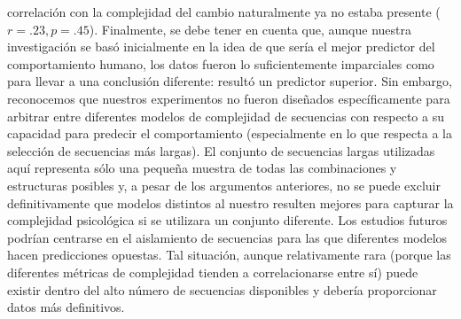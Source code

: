 correlación con la complejidad del cambio naturalmente ya no estaba presente ($r = .23, p = .45$). Finalmente, se debe tener en cuenta que, aunque nuestra investigación se basó inicialmente en la idea de que \mdlbin sería el mejor predictor del comportamiento humano, los datos fueron lo suficientemente imparciales como para llevar a una conclusión diferente: \mdlbinfrag resultó un predictor superior. Sin embargo, reconocemos que nuestros experimentos no fueron diseñados específicamente para arbitrar entre diferentes modelos de complejidad de secuencias con respecto a su capacidad para predecir el comportamiento (especialmente en lo que respecta a la selección de secuencias más largas). El conjunto de secuencias largas utilizadas aquí representa sólo una pequeña muestra de todas las combinaciones y estructuras posibles y, a pesar de los argumentos anteriores, no se puede excluir definitivamente que modelos distintos al nuestro resulten mejores para capturar la complejidad psicológica si se utilizara un conjunto diferente. Los estudios futuros podrían centrarse en el aislamiento de secuencias para las que diferentes modelos hacen predicciones opuestas. Tal situación, aunque relativamente rara (porque las diferentes métricas de complejidad tienden a correlacionarse entre sí) puede existir dentro del alto número de secuencias disponibles y debería proporcionar datos más definitivos.

